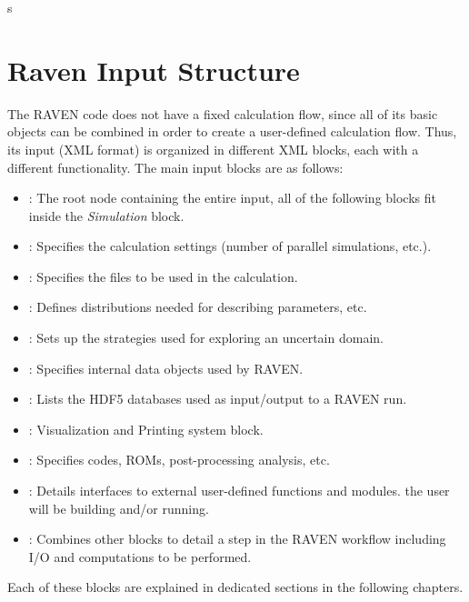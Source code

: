 s\section{Raven Input Structure}
The RAVEN code does not have a fixed calculation flow, since all of its basic
objects can be combined in order to create a user-defined calculation flow.
%
Thus, its input (XML format) is organized in different XML blocks, each with a
different functionality.
%
The main input blocks are as follows:
\begin{itemize}
  \item {}: The root node containing the
  entire input, all of
  the following blocks fit inside the \emph{Simulation} block.
  \item {}: Specifies the calculation
  settings (number of parallel simulations, etc.).
  \item {}: Specifies the files to be
  used in the calculation.
  \item {}: Defines distributions
  needed for describing parameters, etc.
  \item {}: Sets up the strategies used for
  exploring an uncertain domain.
  \item {}: Specifies internal data objects
  used by RAVEN.
  \item {}: Lists the HDF5 databases used
  as input/output to a
  RAVEN run.
  \item {}: Visualization and
  Printing system block.
  \item {}: Specifies codes, ROMs,
  post-processing analysis, etc.
  \item {}: Details interfaces to external
  user-defined functions and modules.
  the user will be building and/or running.
  \item {}: Combines other blocks to detail a
  step in the RAVEN workflow including I/O and computations to be performed.
\end{itemize}

Each of these blocks are explained in dedicated sections in the following
chapters.
%
